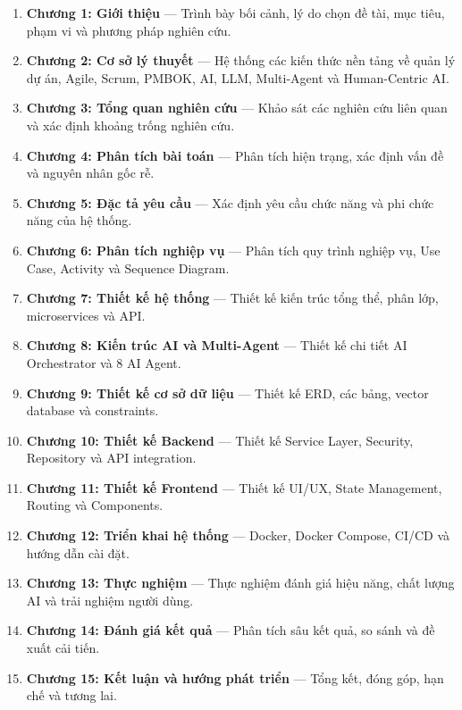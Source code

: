 \documentclass[12pt,a4paper]{report}
\begin{document}
\begin{enumerate}
\item \textbf{Chương 1: Giới thiệu} — Trình bày bối cảnh, lý do chọn đề tài, mục tiêu, phạm vi và phương pháp nghiên cứu.

\item \textbf{Chương 2: Cơ sở lý thuyết} — Hệ thống các kiến thức nền tảng về quản lý dự án, Agile, Scrum, PMBOK, AI, LLM, Multi-Agent và Human-Centric AI.

\item \textbf{Chương 3: Tổng quan nghiên cứu} — Khảo sát các nghiên cứu liên quan và xác định khoảng trống nghiên cứu.

\item \textbf{Chương 4: Phân tích bài toán} — Phân tích hiện trạng, xác định vấn đề và nguyên nhân gốc rễ.

\item \textbf{Chương 5: Đặc tả yêu cầu} — Xác định yêu cầu chức năng và phi chức năng của hệ thống.

\item \textbf{Chương 6: Phân tích nghiệp vụ} — Phân tích quy trình nghiệp vụ, Use Case, Activity và Sequence Diagram.

\item \textbf{Chương 7: Thiết kế hệ thống} — Thiết kế kiến trúc tổng thể, phân lớp, microservices và API.

\item \textbf{Chương 8: Kiến trúc AI và Multi-Agent} — Thiết kế chi tiết AI Orchestrator và 8 AI Agent.

\item \textbf{Chương 9: Thiết kế cơ sở dữ liệu} — Thiết kế ERD, các bảng, vector database và constraints.

\item \textbf{Chương 10: Thiết kế Backend} — Thiết kế Service Layer, Security, Repository và API integration.

\item \textbf{Chương 11: Thiết kế Frontend} — Thiết kế UI/UX, State Management, Routing và Components.

\item \textbf{Chương 12: Triển khai hệ thống} — Docker, Docker Compose, CI/CD và hướng dẫn cài đặt.

\item \textbf{Chương 13: Thực nghiệm} — Thực nghiệm đánh giá hiệu năng, chất lượng AI và trải nghiệm người dùng.

\item \textbf{Chương 14: Đánh giá kết quả} — Phân tích sâu kết quả, so sánh và đề xuất cải tiến.

\item \textbf{Chương 15: Kết luận và hướng phát triển} — Tổng kết, đóng góp, hạn chế và tương lai.
\end{enumerate}
\end{document}
